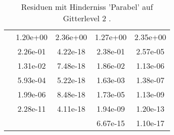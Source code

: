 \begin{table}
\begin{tabular}{c|cc|cc|}
\multicolumn{1}{|c|}{} & \multicolumn{1}{|c|}{  1.20e+00} & \multicolumn{1}{|c|}{  2.36e+00} & \multicolumn{1}{|c|}{  1.27e+00} & \multicolumn{1}{|c|}{  2.35e+00} \\ 
\multicolumn{1}{|c|}{} & \multicolumn{1}{|c|}{  2.26e-01} & \multicolumn{1}{|c|}{  4.22e-18} & \multicolumn{1}{|c|}{  2.38e-01} & \multicolumn{1}{|c|}{  2.57e-05} \\ 
\multicolumn{1}{|c|}{} & \multicolumn{1}{|c|}{  1.31e-02} & \multicolumn{1}{|c|}{  7.48e-18} & \multicolumn{1}{|c|}{  1.86e-02} & \multicolumn{1}{|c|}{  1.13e-06} \\ 
\multicolumn{1}{|c|}{} & \multicolumn{1}{|c|}{  5.93e-04} & \multicolumn{1}{|c|}{  5.22e-18} & \multicolumn{1}{|c|}{  1.63e-03} & \multicolumn{1}{|c|}{  1.38e-07} \\ 
\multicolumn{1}{|c|}{} & \multicolumn{1}{|c|}{  1.99e-06} & \multicolumn{1}{|c|}{  8.48e-18} & \multicolumn{1}{|c|}{  1.73e-05} & \multicolumn{1}{|c|}{  1.13e-09} \\ 
\multicolumn{1}{|c|}{} & \multicolumn{1}{|c|}{  2.28e-11} & \multicolumn{1}{|c|}{  4.11e-18} & \multicolumn{1}{|c|}{  1.94e-09} & \multicolumn{1}{|c|}{  1.20e-13} \\ 
\multicolumn{1}{|c|}{} & \multicolumn{1}{|c|}{} & \multicolumn{1}{|c|}{} & \multicolumn{1}{|c|}{  6.67e-15} & \multicolumn{1}{|c|}{  1.10e-17} \\ 
\hline 
\end{tabular}\caption{Residuen mit Hinderniss 'Parabel' auf Gitterlevel 2 .}\label{tab:Residuum_Parabel_level2}
\end{table} 
